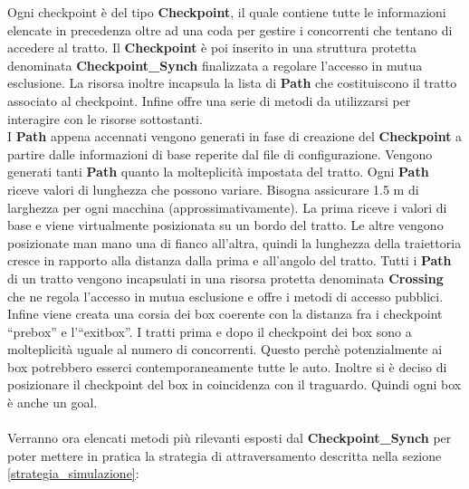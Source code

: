 Ogni checkpoint \`{e} del tipo \textbf{Checkpoint}, il quale contiene tutte le informazioni elencate in precedenza oltre ad una coda per gestire
i concorrenti che tentano di accedere al tratto. Il \textbf{Checkpoint} \`{e} poi inserito in una struttura protetta denominata 
\textbf{Checkpoint\_Synch} finalizzata a regolare l'accesso in mutua esclusione. La risorsa inoltre incapsula la lista di \textbf{Path}
che costituiscono il tratto associato al checkpoint. Infine offre una serie di metodi da utilizzarsi per interagire con le risorse sottostanti.\\
I \textbf{Path} appena accennati vengono generati in fase di creazione del \textbf{Checkpoint} a partire dalle informazioni di base
reperite dal file di configurazione. Vengono generati tanti \textbf{Path} quanto la molteplicit\`{a} impostata del tratto. Ogni \textbf{Path} 
riceve valori di lunghezza che possono variare. Bisogna assicurare 1.5 m di larghezza per ogni macchina (approssimativamente). La prima
riceve i valori di base e viene virtualmente posizionata su un bordo del tratto. Le altre vengono posizionate man mano una di fianco all'altra,
quindi la lunghezza della traiettoria cresce in rapporto alla distanza dalla prima e all'angolo del tratto. Tutti i \textbf{Path} di un tratto
vengono incapsulati in una risorsa protetta denominata \textbf{Crossing} che ne regola l'accesso in mutua esclusione e offre i metodi di 
accesso pubblici.\\
Infine viene creata una corsia dei box coerente con la distanza fra i checkpoint ``prebox'' e l'``exitbox''. I tratti prima e dopo il checkpoint
dei box sono a molteplicit\`{a} uguale al numero di concorrenti. Questo perch\`{e} potenzialmente ai box potrebbero esserci contemporaneamente tutte
le auto. Inoltre si \`{e} deciso di posizionare il checkpoint del box in coincidenza con il traguardo. Quindi ogni box \`{e} anche un goal.\\\\
Verranno ora elencati metodi pi\`{u} rilevanti esposti dal \textbf{Checkpoint\_Synch} 
per poter mettere in pratica la strategia di attraversamento descritta nella sezione \ref{strategia_simulazione}:
